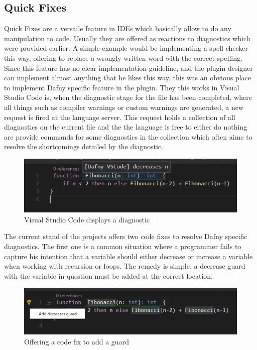\subsection{Quick Fixes} \label{quickfixes}
Quick Fixes are a versaile feature in IDEs which basically allow to do any manipulation to code. Usually they are offered as reactions to diagnostics which were provided earlier. A simple example would be implementing a spell checker this way, offering to replace a wrongly written word with the correct spelling. \newline
Since this feature has no clear implementation guideline, and the plugin designer can implement almost anything that he likes this way, this was an obvious place to implement Dafny specific feature in the plugin. \newline
They this works in Visual Studio Code is, when the diagnostic stage for the file has been completed, where all things such as compiler warnings or custom warnings are generated,  a new request is fired at the language server. This request holds a collection of all diagnostics on the current file and the the language is free to either do nothing are provide commands for some diagnostics in the collection which often aime to resolve the shortcomings detailed by the diagnostic. \newline
  \begin{figure}[H]
	\centering
	\includegraphics[width=1\textwidth]{img/diagnostic}
	\caption{Visual Studio Code displays a diagnostic}
	\label{fig:diagnostic}
\end{figure}
The current stand of the projects offers two code fixes to resolve Dafny specific diagnostics. \newline
The first one is a common situation where a programmer fails to capture his intention that a variable should either decrease or increase a variable when working with recursion or loops. The remedy is simple, a decrease guard with the variable in question must be added at the correct location. \newline
  \begin{figure}[H]
	\centering
	\includegraphics[width=1\textwidth]{img/decreaseGuard}
	\caption{Offering a code fix to add a guard}
	\label{fig:decreaseguard}
\end{figure}
